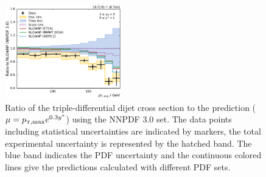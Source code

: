 \begin{figure}[htbp]
    \includegraphics[width=0.45\textwidth]{figures/measurement/ratio_to_NNPDF30+np_totcomp_yb2ys0.pdf}
    \caption[Ratio of measured cross sections to prediction using different PDFs]{
    Ratio of the triple-differential dijet cross section to the \NLOJETPP
    prediction ($\mu=\ptmax e^{0.3 \ystar}$) using the NNPDF 3.0 set. The data
    points including statistical uncertainties are indicated by markers, the total
    experimental uncertainty is represented by the hatched band. The blue
    band indicates the PDF uncertainty and the continuous colored lines give the
    predictions calculated with different PDF sets.}
    \label{fig:ratio_nnpdf30_nlo}
\end{figure}

